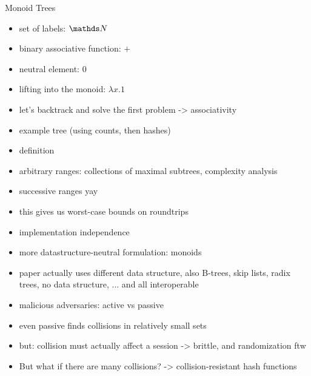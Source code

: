\documentclass{beamer}
\begin{document}
\begin{frame}{Monoid Trees}
    \begin{itemize}
        \item set of labels: $\N$
        \item binary associative function: $+$
        \item neutral element: $0$\pause
        \item lifting into the monoid: $\lambda x.1$
    \end{itemize}
\end{frame}

\begin{frame}{}
    
\end{frame}

\begin{itemize}
    \item let's backtrack and solve the first problem -> associativity
    \item example tree (using counts, then hashes)
    \item definition
    \item arbitrary ranges: collections of maximal subtrees, complexity analysis
    \item successive ranges yay
\end{itemize}

\begin{itemize}
    \item this gives us worst-case bounds on roundtrips
    \item implementation independence
    \item more datastructure-neutral formulation: monoids
    \item paper actually uses different data structure, also B-trees, skip lists, radix trees, no data structure, ... and all interoperable
\end{itemize}

\begin{itemize}
    \item malicious adversaries: active vs passive
    \item even passive finds collisions in relatively small sets
    \item but: collision must actually affect a session -> brittle, and randomization ftw
    \item But what if there are many collisions? -> collision-resistant hash functions
\end{itemize}
\end{document}
